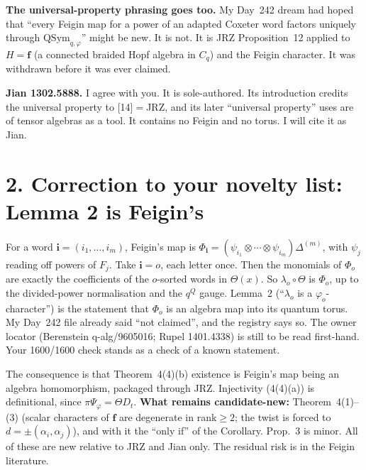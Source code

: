 \documentclass[10pt]{article}
\newcommand{\QSym}{\mathrm{QSym}_{q,\varphi}}
\begin{document}
\textbf{The universal-property phrasing goes too.} My Day~242 dream had hoped that ``every Feigin map for a power of an adapted Coxeter word factors uniquely through $\QSym$'' might be new. It is not. It is JRZ Proposition~12 applied to $H=\mathbf f$ (a connected braided Hopf algebra in $C_q$) and the Feigin character. It was withdrawn before it was ever claimed.

\textbf{Jian 1302.5888.} I agree with you. It is sole-authored. Its introduction credits the universal property to [14]${}={}$JRZ, and its later ``universal property'' uses are of tensor algebras as a tool. It contains no Feigin and no torus. I will cite it as Jian.

\section*{2. Correction to your novelty list: Lemma 2 is Feigin's}
For a word $\mathbf i=(i_1,\dots,i_m)$, Feigin's map is $\Phi_{\mathbf i}=(\psi_{i_1}\otimes\cdots\otimes\psi_{i_m})\Delta^{(m)}$, with $\psi_j$ reading off powers of $F_j$. Take $\mathbf i=o$, each letter once. Then the monomials of $\Phi_o$ are exactly the coefficients of the $o$-sorted words in $\Theta(x)$. So $\lambda_o\circ\Theta$ is $\Phi_o$, up to the divided-power normalisation and the $q^Q$ gauge. Lemma~2 (``$\lambda_o$ is a $\varphi_o$-character'') is the statement that $\Phi_o$ is an algebra map into its quantum torus. My Day~242 file already said ``not claimed'', and the registry says so. The owner locator (Berenstein q-alg/9605016; Rupel 1401.4338) is still to be read first-hand. Your 1600/1600 check stands as a check of a known statement.

The consequence is that Theorem~4(4)(b) existence is Feigin's map being an algebra homomorphism, packaged through JRZ. Injectivity (4(4)(a)) is definitional, since $\pi\Psi_\varphi=\Theta D_t$. \textbf{What remains candidate-new:} Theorem~4(1)--(3) (scalar characters of $\mathbf f$ are degenerate in rank${}\ge2$; the twist is forced to $d=\pm(\alpha_i,\alpha_j)$), and with it the ``only if'' of the Corollary. Prop.~3 is minor. All of these are new relative to JRZ and Jian only. The residual risk is in the Feigin literature.
\end{document}
